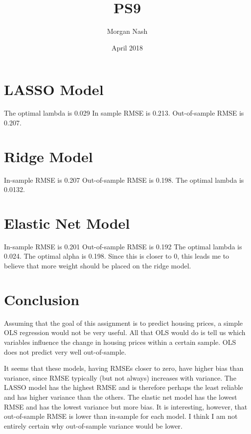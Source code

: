 \documentclass{article}
\title{PS9}
\author{Morgan Nash}
\date{April 2018}
\begin{document}
\section{LASSO Model}
The optimal lambda is 0.029
In sample RMSE is 0.213.
Out-of-sample RMSE is 0.207.


\section{Ridge Model}
In-sample RMSE is 0.207
Out-of-sample RMSE is 0.198.
The optimal lambda is 0.0132.

\section{Elastic Net Model}
In-sample RMSE is 0.201
Out-of-sample RMSE is 0.192
The optimal lambda is 0.024. The optimal alpha is 0.198. Since this is closer to 0, this leads me to believe that more weight should be placed on the ridge model.

\section{Conclusion}
Assuming that the goal of this assignment is to predict housing prices, a simple OLS regression would not be very useful. All that OLS would do is tell us which variables influence the change in housing prices within a certain sample. OLS does not predict very well out-of-sample.

It seems that these models, having RMSEs closer to zero, have higher bias than variance, since RMSE typically (but not always) increases with variance. The LASSO model has the highest RMSE and is therefore perhaps the least reliable and has higher variance than the others. The elastic net model has the lowest RMSE and has the lowest variance but more bias. It is interesting, however, that out-of-sample RMSE is lower than in-sample for each model. I think I am not entirely certain why out-of-sample variance would be lower.
\end{document}
